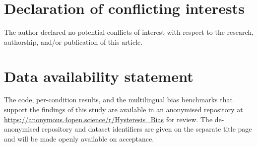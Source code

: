 \documentclass[Afour,sageh,times]{sagej}
\begin{document}
\section*{Declaration of conflicting interests}
The author declared no potential conflicts of interest with respect to the research, authorship, and/or publication of this article.

\section*{Data availability statement}
The code, per-condition results, and the multilingual bias benchmarks that support the findings of this study are available in an anonymised repository at \url{https://anonymous.4open.science/r/Hysteresis_Bias} for review. The de-anonymised repository and dataset identifiers are given on the separate title page and will be made openly available on acceptance.



\end{document}
